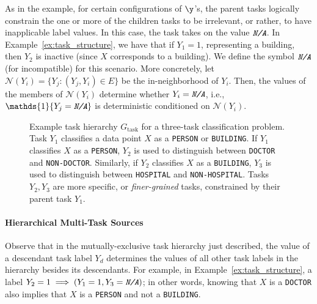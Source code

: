 \documentclass[letterpaper]{article}
\begin{document}
\begin{appendix}
As in the example, for certain configurations of $\y$'s, the parent tasks logically constrain the one or more of the children tasks to be irrelevant, or rather, to have inapplicable label values.
In this case, the task takes on the value $\textit{\texttt{N/A}}$.
In Example~\ref{ex:task_structure}, we have that if $Y_1 = 1$, representing a building, then $Y_2$ is inactive (since $X$ corresponds to a building).
We define the symbol $\textit{\texttt{N/A}}$ (for incompatible) for this scenario.
More concretely, let $\mathcal{N}(Y_i) = \{Y_j : (Y_j, Y_i) \in E\}$ be the in-neighborhood of $Y_i$.
Then, the values of the members of $\mathcal{N}(Y_i)$ determine whether $Y_i = \textit{\texttt{N/A}}$, i.e., $\mathds{1}\{Y_j = \textit{\texttt{N/A}}\}$ is deterministic conditioned on $\mathcal{N}(Y_i)$. 
\begin{figure}
\centering
{}
\caption{
	Example task hierarchy $G_{\text{task}}$ for a three-task classification problem.
	Task $Y_1$ classifies a data point $X$ as a \texttt{PERSON} or \texttt{BUILDING}.
	If $Y_1$ classifies $X$ as a \texttt{PERSON}, $Y_2$ is used to distinguish between \texttt{DOCTOR} and \texttt{NON-DOCTOR}.
	Similarly, if $Y_2$ classifies $X$ as a \texttt{BUILDING}, $Y_3$ is used to distinguish between \texttt{HOSPITAL} and \texttt{NON-HOSPITAL}.
	Tasks $Y_2,Y_3$ are more specific, or \textit{finer-grained} tasks, constrained by their parent task $Y_1$.
}
\label{fig:tree_task}
\end{figure}
\paragraph*{Hierarchical Multi-Task Sources}
Observe that in the mutually-exclusive task hierarchy just described, the value of a descendant task label $Y_d$ determines the values of all other task labels in the hierarchy besides its descendants.
For example, in Example~\ref{ex:task_structure}, a label $Y_2 = 1 \implies (Y_1=1, Y_3=\textit{\texttt{N/A}})$; in other words, knowing that $X$ is a \texttt{DOCTOR} also implies that $X$ is a \texttt{PERSON} and not a \texttt{BUILDING}.


\end{appendix}
\end{document}
